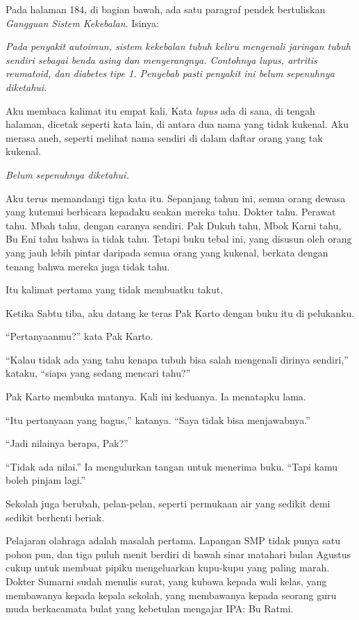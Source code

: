 \documentclass[11pt,twoside,openany]{book}
\makeatletter
\newcommand{\scenebreak}{\par\vspace{0.9em}{\centering\textsc{*\hspace{0.7em}*\hspace{0.7em}*}\par}\vspace{0.9em}\@afterindentfalse\@afterheading}
\makeatother
\begin{document}
Pada halaman 184, di bagian bawah, ada satu paragraf pendek bertuliskan \emph{Gangguan Sistem Kekebalan}. Isinya:

\emph{Pada penyakit autoimun, sistem kekebalan tubuh keliru mengenali jaringan tubuh sendiri sebagai benda asing dan menyerangnya. Contohnya lupus, artritis reumatoid, dan diabetes tipe 1. Penyebab pasti penyakit ini belum sepenuhnya diketahui.}

Aku membaca kalimat itu empat kali. Kata \emph{lupus} ada di sana, di tengah halaman, dicetak seperti kata lain, di antara dua nama yang tidak kukenal. Aku merasa aneh, seperti melihat nama sendiri di dalam daftar orang yang tak kukenal.

\emph{Belum sepenuhnya diketahui.}

Aku terus memandangi tiga kata itu. Sepanjang tahun ini, semua orang dewasa yang kutemui berbicara kepadaku seakan mereka tahu. Dokter tahu. Perawat tahu. Mbah tahu, dengan caranya sendiri. Pak Dukuh tahu, Mbok Karni tahu, Bu Eni tahu bahwa ia tidak tahu. Tetapi buku tebal ini, yang disusun oleh orang yang jauh lebih pintar daripada semua orang yang kukenal, berkata dengan tenang bahwa mereka juga tidak tahu.

Itu kalimat pertama yang tidak membuatku takut.

Ketika Sabtu tiba, aku datang ke teras Pak Karto dengan buku itu di pelukanku.

``Pertanyaanmu?'' kata Pak Karto.

``Kalau tidak ada yang tahu kenapa tubuh bisa salah mengenali dirinya sendiri,'' kataku, ``siapa yang sedang mencari tahu?''

Pak Karto membuka matanya. Kali ini keduanya. Ia menatapku lama.

``Itu pertanyaan yang bagus,'' katanya. ``Saya tidak bisa menjawabnya.''

``Jadi nilainya berapa, Pak?''

``Tidak ada nilai.'' Ia mengulurkan tangan untuk menerima buku. ``Tapi kamu boleh pinjam lagi.''

\scenebreak
Sekolah juga berubah, pelan-pelan, seperti permukaan air yang sedikit demi sedikit berhenti beriak.

Pelajaran olahraga adalah masalah pertama. Lapangan SMP tidak punya satu pohon pun, dan tiga puluh menit berdiri di bawah sinar matahari bulan Agustus cukup untuk membuat pipiku mengeluarkan kupu-kupu yang paling marah. Dokter Sumarni sudah menulis surat, yang kubawa kepada wali kelas, yang membawanya kepada kepala sekolah, yang membawanya kepada seorang guru muda berkacamata bulat yang kebetulan mengajar IPA: Bu Ratmi.
\end{document}
